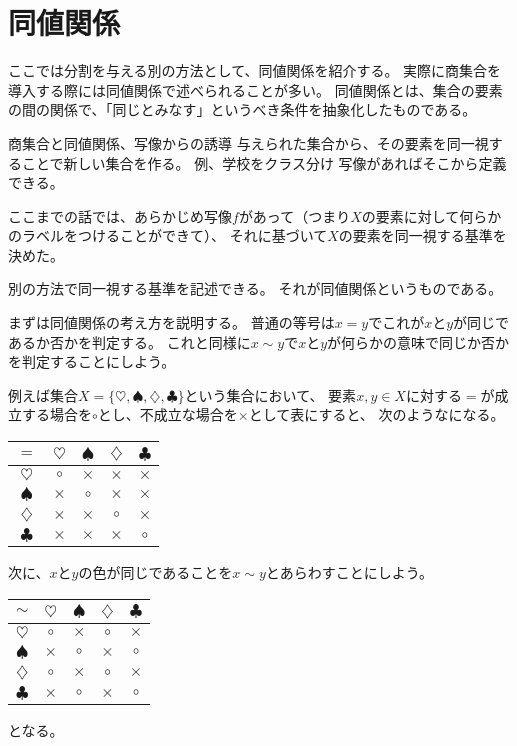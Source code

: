 \section{同値関係}
ここでは分割を与える別の方法として、同値関係を紹介する。
実際に商集合を導入する際には同値関係で述べられることが多い。
同値関係とは、集合の要素の間の関係で、「同じとみなす」というべき条件を抽象化したものである。

商集合と同値関係、写像からの誘導
与えられた集合から、その要素を同一視することで新しい集合を作る。
例、学校をクラス分け
写像があればそこから定義できる。

ここまでの話では、あらかじめ写像$f$があって（つまり$X$の要素に対して何らかのラベルをつけることができて）、
それに基づいて$X$の要素を同一視する基準を決めた。

別の方法で同一視する基準を記述できる。
それが同値関係というものである。

まずは同値関係の考え方を説明する。
普通の等号は$x=y$でこれが$x$と$y$が同じであるか否かを判定する。
これと同様に$x\sim y$で$x$と$y$が何らかの意味で同じか否かを判定することにしよう。

例えば集合$X=\{\heartsuit,\spadesuit,\diamondsuit,\clubsuit\}$という集合において、
要素$x,y\in X$に対する$=$が成立する場合を$\circ$とし、不成立な場合を$\times$として表にすると、
次のようなになる。

\begin{table}[htb]
  \begin{tabular}{|c||c|c|c|c|} \hline
    $=$ & $\heartsuit$ & $\spadesuit$ & $\diamondsuit$ & $\clubsuit$ \\ \hline \hline
    $\heartsuit$ & $\circ$ & $\times$ & $\times$ & $\times$ \\ \hline
    $\spadesuit$ & $\times$ & $\circ$ & $\times$ & $\times$ \\ \hline
    $\diamondsuit$ & $\times$ & $\times$ & $\circ$ & $\times$ \\ \hline
    $\clubsuit$ & $\times$ & $\times$ & $\times$ & $\circ$ \\ \hline
  \end{tabular}
\end{table}

次に、$x$と$y$の色が同じであることを$x\sim y$とあらわすことにしよう。
\begin{table}[htb]
  \begin{tabular}{|c||c|c|c|c|} \hline
    $\sim$ & $\heartsuit$ & $\spadesuit$ & $\diamondsuit$ & $\clubsuit$ \\ \hline \hline
    $\heartsuit$ & $\circ$ & $\times$ & $\circ$ & $\times$ \\ \hline
    $\spadesuit$ & $\times$ & $\circ$ & $\times$ & $\circ$ \\ \hline
    $\diamondsuit$ & $\circ$ & $\times$ & $\circ$ & $\times$ \\ \hline
    $\clubsuit$ & $\times$ & $\circ$ & $\times$ & $\circ$ \\ \hline
  \end{tabular}
\end{table}
となる。

